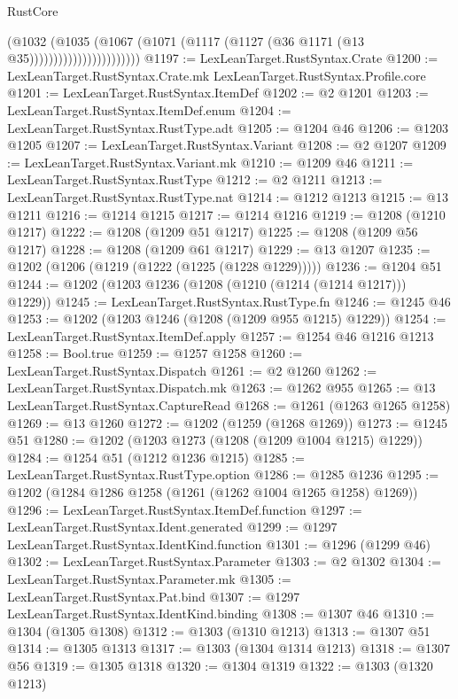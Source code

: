 \begin{lexlean}{RustCore}
\begin{coremodule}
                                  (@1032
                                    (@1035
                                      (@1067
                                        (@1071
                                          (@1117 (@1127 (@36 @1171 (@13 @35)))))))))))))))))))))))
@1197 := LexLeanTarget.RustSyntax.Crate
@1200 := LexLeanTarget.RustSyntax.Crate.mk LexLeanTarget.RustSyntax.Profile.core
@1201 := LexLeanTarget.RustSyntax.ItemDef
@1202 := @2 @1201
@1203 := LexLeanTarget.RustSyntax.ItemDef.enum
@1204 := LexLeanTarget.RustSyntax.RustType.adt
@1205 := @1204 @46
@1206 := @1203 @1205
@1207 := LexLeanTarget.RustSyntax.Variant
@1208 := @2 @1207
@1209 := LexLeanTarget.RustSyntax.Variant.mk
@1210 := @1209 @46
@1211 := LexLeanTarget.RustSyntax.RustType
@1212 := @2 @1211
@1213 := LexLeanTarget.RustSyntax.RustType.nat
@1214 := @1212 @1213
@1215 := @13 @1211
@1216 := @1214 @1215
@1217 := @1214 @1216
@1219 := @1208 (@1210 @1217)
@1222 := @1208 (@1209 @51 @1217)
@1225 := @1208 (@1209 @56 @1217)
@1228 := @1208 (@1209 @61 @1217)
@1229 := @13 @1207
@1235 := @1202 (@1206 (@1219 (@1222 (@1225 (@1228 @1229)))))
@1236 := @1204 @51
@1244 := @1202 (@1203 @1236 (@1208 (@1210 (@1214 (@1214 @1217))) @1229))
@1245 := LexLeanTarget.RustSyntax.RustType.fn
@1246 := @1245 @46
@1253 := @1202 (@1203 @1246 (@1208 (@1209 @955 @1215) @1229))
@1254 := LexLeanTarget.RustSyntax.ItemDef.apply
@1257 := @1254 @46 @1216 @1213
@1258 := Bool.true
@1259 := @1257 @1258
@1260 := LexLeanTarget.RustSyntax.Dispatch
@1261 := @2 @1260
@1262 := LexLeanTarget.RustSyntax.Dispatch.mk
@1263 := @1262 @955
@1265 := @13 LexLeanTarget.RustSyntax.CaptureRead
@1268 := @1261 (@1263 @1265 @1258)
@1269 := @13 @1260
@1272 := @1202 (@1259 (@1268 @1269))
@1273 := @1245 @51
@1280 := @1202 (@1203 @1273 (@1208 (@1209 @1004 @1215) @1229))
@1284 := @1254 @51 (@1212 @1236 @1215)
@1285 := LexLeanTarget.RustSyntax.RustType.option
@1286 := @1285 @1236
@1295 := @1202 (@1284 @1286 @1258 (@1261 (@1262 @1004 @1265 @1258) @1269))
@1296 := LexLeanTarget.RustSyntax.ItemDef.function
@1297 := LexLeanTarget.RustSyntax.Ident.generated
@1299 := @1297 LexLeanTarget.RustSyntax.IdentKind.function
@1301 := @1296 (@1299 @46)
@1302 := LexLeanTarget.RustSyntax.Parameter
@1303 := @2 @1302
@1304 := LexLeanTarget.RustSyntax.Parameter.mk
@1305 := LexLeanTarget.RustSyntax.Pat.bind
@1307 := @1297 LexLeanTarget.RustSyntax.IdentKind.binding
@1308 := @1307 @46
@1310 := @1304 (@1305 @1308)
@1312 := @1303 (@1310 @1213)
@1313 := @1307 @51
@1314 := @1305 @1313
@1317 := @1303 (@1304 @1314 @1213)
@1318 := @1307 @56
@1319 := @1305 @1318
@1320 := @1304 @1319
@1322 := @1303 (@1320 @1213)

\end{coremodule}
\end{lexlean}
